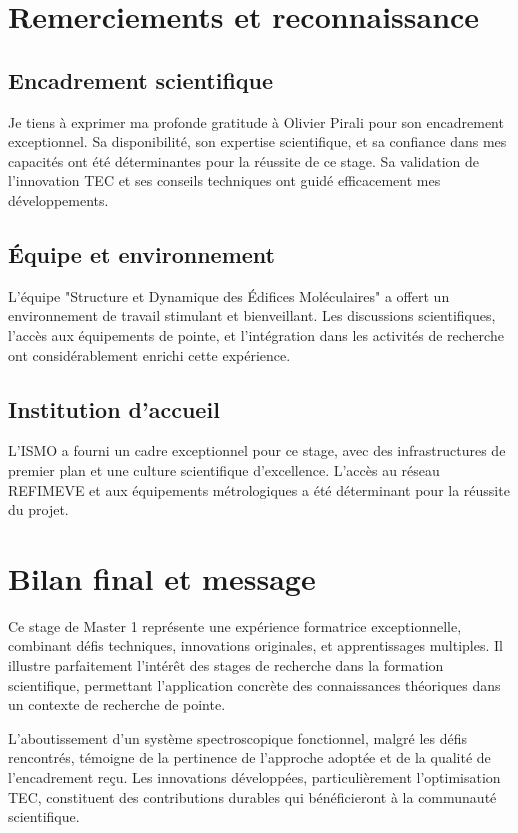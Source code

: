 \section{Remerciements et reconnaissance}

\subsection{Encadrement scientifique}

Je tiens à exprimer ma profonde gratitude à Olivier Pirali pour son encadrement exceptionnel. Sa disponibilité, son expertise scientifique, et sa confiance dans mes capacités ont été déterminantes pour la réussite de ce stage. Sa validation de l'innovation TEC et ses conseils techniques ont guidé efficacement mes développements.

\subsection{Équipe et environnement}

L'équipe "Structure et Dynamique des Édifices Moléculaires" a offert un environnement de travail stimulant et bienveillant. Les discussions scientifiques, l'accès aux équipements de pointe, et l'intégration dans les activités de recherche ont considérablement enrichi cette expérience.

\subsection{Institution d'accueil}

L'ISMO a fourni un cadre exceptionnel pour ce stage, avec des infrastructures de premier plan et une culture scientifique d'excellence. L'accès au réseau REFIMEVE et aux équipements métrologiques a été déterminant pour la réussite du projet.

\section{Bilan final et message}

Ce stage de Master 1 représente une expérience formatrice exceptionnelle, combinant défis techniques, innovations originales, et apprentissages multiples. Il illustre parfaitement l'intérêt des stages de recherche dans la formation scientifique, permettant l'application concrète des connaissances théoriques dans un contexte de recherche de pointe.

L'aboutissement d'un système spectroscopique fonctionnel, malgré les défis rencontrés, témoigne de la pertinence de l'approche adoptée et de la qualité de l'encadrement reçu. Les innovations développées, particulièrement l'optimisation TEC, constituent des contributions durables qui bénéficieront à la communauté scientifique.

